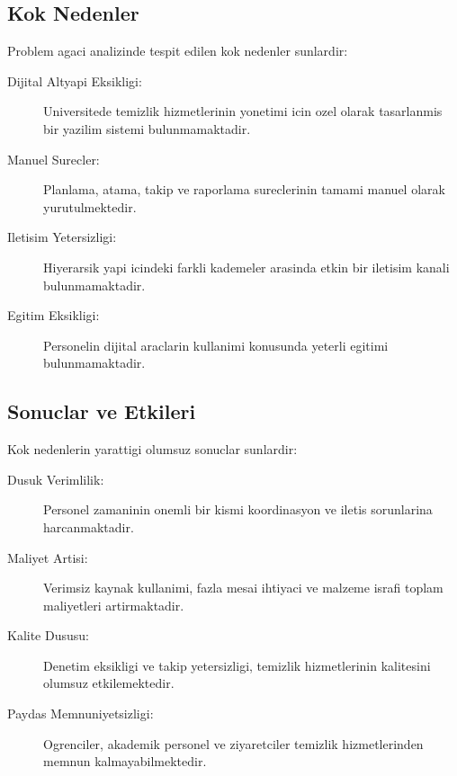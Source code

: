 \subsection{Kok Nedenler}
\label{subsec:kok-nedenler}

Problem agaci analizinde tespit edilen kok nedenler sunlardir:

\begin{description}
    \item[Dijital Altyapi Eksikligi:] Universitede temizlik 
    hizmetlerinin yonetimi icin ozel olarak tasarlanmis bir 
    yazilim sistemi bulunmamaktadir.
    
    \item[Manuel Surecler:] Planlama, atama, takip ve raporlama 
    sureclerinin tamami manuel olarak yurutulmektedir.
    
    \item[Iletisim Yetersizligi:] Hiyerarsik yapi icindeki farkli 
    kademeler arasinda etkin bir iletisim kanali bulunmamaktadir.
    
    \item[Egitim Eksikligi:] Personelin dijital araclarin kullanimi 
    konusunda yeterli egitimi bulunmamaktadir.
\end{description}

\subsection{Sonuclar ve Etkileri}
\label{subsec:sonuclar}

Kok nedenlerin yarattigi olumsuz sonuclar sunlardir:

\begin{description}
    \item[Dusuk Verimlilik:] Personel zamaninin onemli bir kismi 
    koordinasyon ve iletis sorunlarina harcanmaktadir.
    
    \item[Maliyet Artisi:] Verimsiz kaynak kullanimi, fazla mesai 
    ihtiyaci ve malzeme israfi toplam maliyetleri artirmaktadir.
    
    \item[Kalite Dususu:] Denetim eksikligi ve takip yetersizligi, 
    temizlik hizmetlerinin kalitesini olumsuz etkilemektedir.
    
    \item[Paydas Memnuniyetsizligi:] Ogrenciler, akademik personel 
    ve ziyaretciler temizlik hizmetlerinden memnun kalmayabilmektedir.
\end{description}

